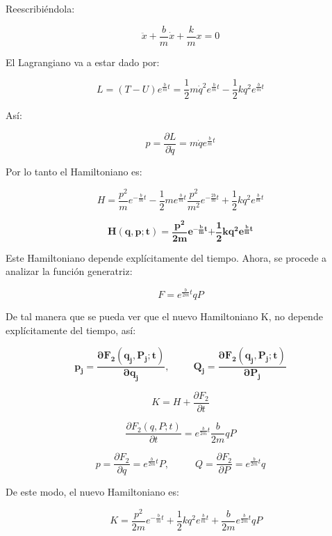\documentclass[]{article}
\begin{document}
Reescribiéndola:

\[\ddot{x} + \frac{b}{m}\dot{x} + \frac{k}{m}x = 0\]

El Lagrangiano va a estar dado por:

\[L = (T - U)e^{\frac{b}{m}t} = \frac{1}{2}m{\dot{q}}^{2}e^{\frac{b}{m}t} - \frac{1}{2}kq^{2}e^{\frac{b}{m}t}\]

Así:

\[p = \frac{\partial L}{\partial\dot{q}} = m\dot{q}e^{\frac{b}{m}t}\]

Por lo tanto el Hamiltoniano es:

\[H = \frac{p^{2}}{m}e^{- \frac{b}{m}t} - \frac{1}{2}me^{\frac{b}{m}t}\frac{p^{2}}{m^{2}}e^{- \frac{2b}{m}t} + \frac{1}{2}kq^{2}e^{\frac{b}{m}t}\]

\[\mathbf{H}\left( \mathbf{q,p;t} \right)\mathbf{=}\frac{\mathbf{p}^{\mathbf{2}}}{\mathbf{2}\mathbf{m}}\mathbf{e}^{\mathbf{-}\frac{\mathbf{b}}{\mathbf{m}}\mathbf{t}}\mathbf{+}\frac{\mathbf{1}}{\mathbf{2}}\mathbf{k}\mathbf{q}^{\mathbf{2}}\mathbf{e}^{\frac{\mathbf{b}}{\mathbf{m}}\mathbf{t}}\]

Este Hamiltoniano depende explícitamente del tiempo. Ahora, se procede a
analizar la función generatriz:

\[F = e^{\frac{b}{2m}t}qP\]

De tal manera que se pueda ver que el nuevo Hamiltoniano K, no depende
explícitamente del tiempo, así:

\[\mathbf{p}_{\mathbf{j}}\mathbf{=}\frac{\mathbf{\partial}\mathbf{F}_{\mathbf{2}}\left( \mathbf{q}_{\mathbf{j}}\mathbf{,}\mathbf{P}_{\mathbf{j}}\mathbf{;t} \right)}{\mathbf{\partial}\mathbf{q}_{\mathbf{j}}}\mathbf{,\ \ \ \ \ \ \ \ \ \ \ }\mathbf{Q}_{\mathbf{j}}\mathbf{=}\frac{\mathbf{\partial}\mathbf{F}_{\mathbf{2}}\left( \mathbf{q}_{\mathbf{j}}\mathbf{,}\mathbf{P}_{\mathbf{j}}\mathbf{;t} \right)}{\mathbf{\partial}\mathbf{P}_{\mathbf{j}}}\]

\[K = H + \frac{\partial F_{2}}{\partial t}\]

\[\frac{\partial F_{2}(q,P;t)}{\partial t} = e^{\frac{b}{2m}t}\frac{b}{2m}qP\]

\[p = \frac{\partial F_{2}}{\partial q} = e^{\frac{b}{2m}t}P,\ \ \ \ \ \ \ \ \ \ \ \ Q = \frac{\partial F_{2}}{\partial P} = e^{\frac{b}{2m}t}q\]

De este modo, el nuevo Hamiltoniano es:

\[\ \ \ \ \ K = \frac{p^{2}}{2m}e^{- \frac{b}{m}t} + \frac{1}{2}kq^{2}e^{\frac{b}{m}t} + \frac{b}{2m}e^{\frac{b}{2m}t}qP\]
\end{document}
